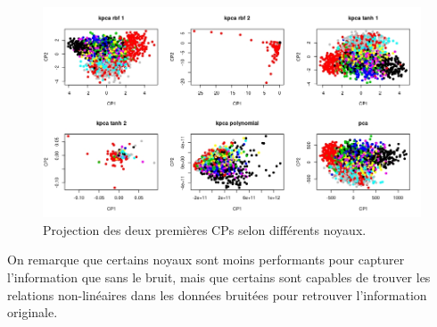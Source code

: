\begin{figure}[H]
	\includegraphics[width=\textwidth]{comparaison-noisy}
	\caption{Projection des deux premières CPs selon différents noyaux.}
\end{figure}

On remarque que certains noyaux sont moins performants pour capturer l'information que sans le bruit, mais que certains sont capables de trouver les relations non-linéaires dans les données bruitées pour retrouver l'information originale. 
